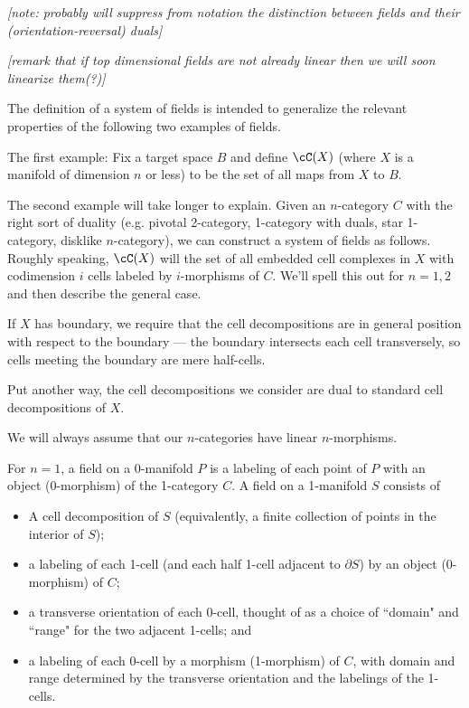 \documentclass[11pt,leqno]{amsart}
\def\bd{\partial}
\def\nn#1{{{\it \small [#1]}}}
\begin{document}
\nn{note: probably will suppress from notation the distinction
between fields and their (orientation-reversal) duals}

\nn{remark that if top dimensional fields are not already linear
then we will soon linearize them(?)}

The definition of a system of fields is intended to generalize
the relevant properties of the following two examples of fields.

The first example: Fix a target space $B$ and define $\cC(X)$ (where $X$
is a manifold of dimension $n$ or less) to be the set of
all maps from $X$ to $B$.

The second example will take longer to explain.
Given an $n$-category $C$ with the right sort of duality
(e.g. pivotal 2-category, 1-category with duals, star 1-category, disklike $n$-category),
we can construct a system of fields as follows.
Roughly speaking, $\cC(X)$ will the set of all embedded cell complexes in $X$
with codimension $i$ cells labeled by $i$-morphisms of $C$.
We'll spell this out for $n=1,2$ and then describe the general case.

If $X$ has boundary, we require that the cell decompositions are in general
position with respect to the boundary --- the boundary intersects each cell
transversely, so cells meeting the boundary are mere half-cells.

Put another way, the cell decompositions we consider are dual to standard cell
decompositions of $X$.

We will always assume that our $n$-categories have linear $n$-morphisms.

For $n=1$, a field on a 0-manifold $P$ is a labeling of each point of $P$ with
an object (0-morphism) of the 1-category $C$.
A field on a 1-manifold $S$ consists of
\begin{itemize}
    \item A cell decomposition of $S$ (equivalently, a finite collection
of points in the interior of $S$);
    \item a labeling of each 1-cell (and each half 1-cell adjacent to $\bd S$)
by an object (0-morphism) of $C$;
    \item a transverse orientation of each 0-cell, thought of as a choice of
``domain" and ``range" for the two adjacent 1-cells; and
    \item a labeling of each 0-cell by a morphism (1-morphism) of $C$, with
domain and range determined by the transverse orientation and the labelings of the 1-cells.
\end{itemize}
\end{document}
